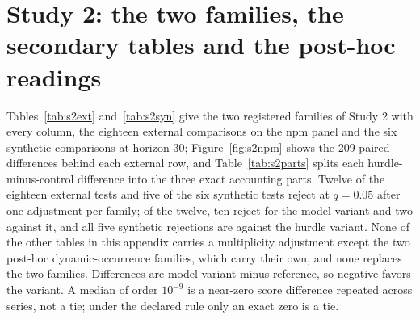 \providecommand{\lm}{\texttt{local\_mean\_28}}
\providecommand{\aets}{\texttt{autoets\_weekly}}
\providecommand{\qs}{QScore9}
\providecommand{\hc}{\texttt{hurdle\_count\_28}}

\section{Study 2: the two families, the secondary tables and the post-hoc readings}
\label{app:s2tables}

Tables~\ref{tab:s2ext} and~\ref{tab:s2syn} give the two registered families of Study 2 with every column,
the eighteen external comparisons on the npm panel and the six synthetic comparisons at horizon 30;
Figure~\ref{fig:s2npm} shows the 209 paired differences behind each external row, and
Table~\ref{tab:s2parts} splits each hurdle-minus-control difference into the three exact accounting parts.
Twelve of the eighteen external tests and five of the six synthetic tests reject at $q = 0.05$ after one
adjustment per family; of the twelve, ten reject for the model variant and two against it, and all five
synthetic rejections are against the hurdle variant. None of the other tables in this appendix carries a
multiplicity adjustment except the two post-hoc dynamic-occurrence families, which carry their own, and
none replaces the two families. Differences are model variant minus reference, so negative favors the
variant. A median of order $10^{-9}$ is a near-zero score difference repeated across series, not a tie; under
the declared rule only an exact zero is a tie.

